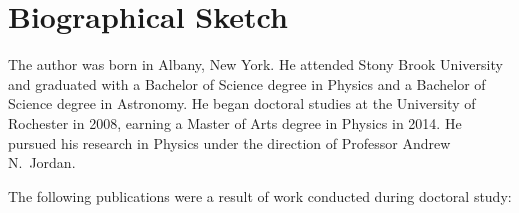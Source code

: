 \chapter*{Biographical Sketch}

The author was born in Albany, New York.  He attended Stony Brook University and graduated with a Bachelor of Science degree in Physics and a Bachelor of Science degree in Astronomy.  He began doctoral studies at the University of Rochester in 2008, earning a Master of Arts degree in Physics in 2014.  He pursued his research in Physics under the direction of Professor Andrew N.~Jordan.

The following publications were a result of work conducted during doctoral study:
\vspace{1cm}



